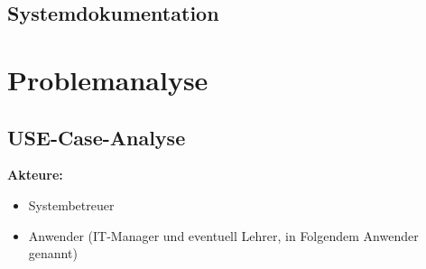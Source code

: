 \section{Systemdokumentation}



\chapter{Problemanalyse}

\section{USE-Case-Analyse}
{\linespread{.5}
	\textbf{Akteure:}
	\begin{itemize}
		\item Systembetreuer
		\item Anwender (IT-Manager und eventuell Lehrer, in Folgendem Anwender genannt)
\end{itemize}}

